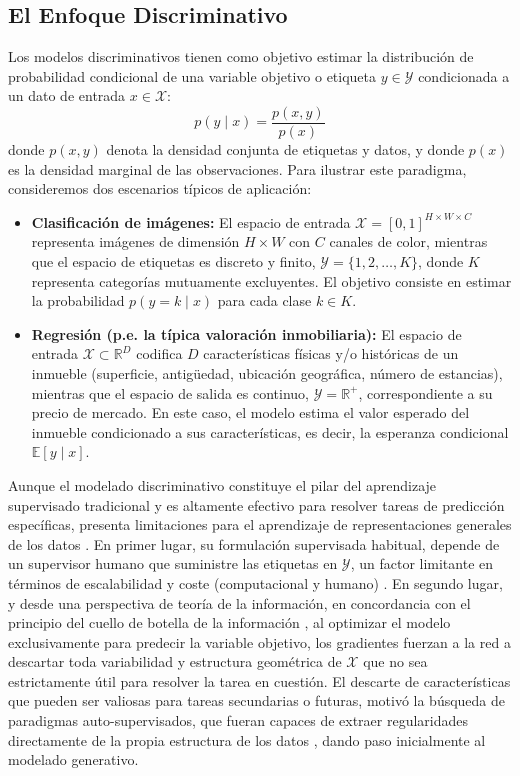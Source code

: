 \subsection{El Enfoque Discriminativo}
Los modelos discriminativos tienen como objetivo estimar la distribución de probabilidad condicional de una variable objetivo o etiqueta $y \in \mathcal{Y}$ condicionada a un dato de entrada $x \in \mathcal{X}$:
\begin{equation}
p(y \mid x) = \frac{p(x, y)}{p(x)}
\end{equation}
donde $p(x,y)$ denota la densidad conjunta de etiquetas y datos, y donde $p(x)$ es la densidad marginal de las observaciones. Para ilustrar este paradigma, consideremos dos escenarios típicos de aplicación:
\begin{itemize}
    \item \textbf{Clasificación de imágenes:} El espacio de entrada $\mathcal{X} = [0, 1]^{H \times W \times C}$ representa imágenes de dimensión $H \times W$ con $C$ canales de color, mientras que el espacio de etiquetas es discreto y finito, $\mathcal{Y} = \{1, 2, \dots, K\}$, donde $K$ representa categorías mutuamente excluyentes. El objetivo consiste en estimar la probabilidad $p(y = k \mid x)$ para cada clase $k \in K$.
    \item \textbf{Regresión (p.e. la típica valoración inmobiliaria):} El espacio de entrada $\mathcal{X} \subset \mathbb{R}^D$ codifica $D$ características físicas y/o históricas de un inmueble (superficie, antigüedad, ubicación geográfica, número de estancias), mientras que el espacio de salida es continuo, $\mathcal{Y} = \mathbb{R}^+$, correspondiente a su precio de mercado. En este caso, el modelo estima el valor esperado del inmueble condicionado a sus características, es decir, la esperanza condicional $\mathbb{E}[y \mid x]$.
\end{itemize}
Aunque el modelado discriminativo constituye el pilar del aprendizaje supervisado tradicional \cite{goodfellow2016deep} y es altamente efectivo para resolver tareas de predicción específicas, presenta limitaciones para el aprendizaje de representaciones generales de los datos \cite{bengio2013representation}. En primer lugar, su formulación supervisada habitual, depende de un supervisor humano que suministre las etiquetas en $\mathcal{Y}$, un factor limitante en términos de escalabilidad y coste (computacional y humano) \cite{lecun2022path}. En segundo lugar, y desde una perspectiva de teoría de la información, en concordancia con el principio del cuello de botella de la información \cite{tishby2000information}, al optimizar el modelo exclusivamente para predecir la variable objetivo, los gradientes fuerzan a la red a descartar toda variabilidad y estructura geométrica de $\mathcal{X}$ que no sea estrictamente útil para resolver la tarea en cuestión. El descarte de características que pueden ser valiosas para tareas secundarias o futuras, motivó la búsqueda de paradigmas auto-supervisados, que fueran capaces de extraer regularidades directamente de la propia estructura de los datos \cite{bengio2013representation}, dando paso inicialmente al modelado generativo.


